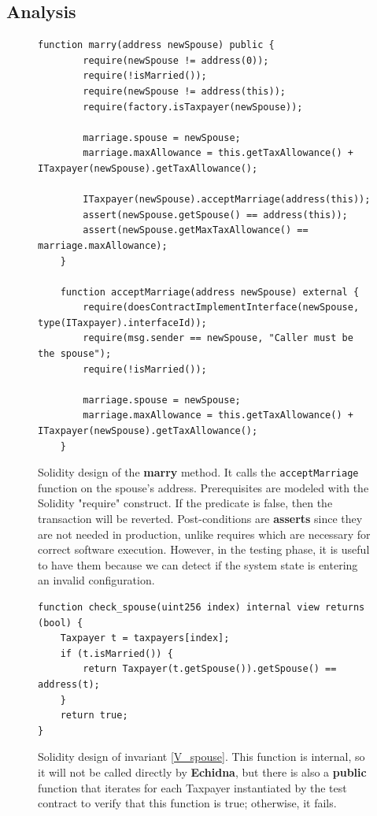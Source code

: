 \documentclass[conference]{IEEEtran}
\begin{document}
\subsection{Analysis}
\begin{figure}
	\centering
	\begin{lstlisting}[style=soliditystyle]
  function marry(address newSpouse) public {
        require(newSpouse != address(0));
        require(!isMarried());
        require(newSpouse != address(this));
        require(factory.isTaxpayer(newSpouse));

        marriage.spouse = newSpouse;
        marriage.maxAllowance = this.getTaxAllowance() + ITaxpayer(newSpouse).getTaxAllowance();

        ITaxpayer(newSpouse).acceptMarriage(address(this));
        assert(newSpouse.getSpouse() == address(this));
        assert(newSpouse.getMaxTaxAllowance() == marriage.maxAllowance);
    }

    function acceptMarriage(address newSpouse) external {
        require(doesContractImplementInterface(newSpouse, type(ITaxpayer).interfaceId));
        require(msg.sender == newSpouse, "Caller must be the spouse");
        require(!isMarried());

        marriage.spouse = newSpouse;
        marriage.maxAllowance = this.getTaxAllowance() + ITaxpayer(newSpouse).getTaxAllowance();
    }
\end{lstlisting}
	\caption{
		Solidity design of the \textbf{marry} method. It calls the \texttt{acceptMarriage} function on the spouse's address.
		Prerequisites are modeled with the Solidity "require" construct. If the predicate is false, then
		the transaction will be reverted.
		Post-conditions are \textbf{asserts} since they are not needed in production, unlike
		requires which are necessary for correct software execution.
		However, in the testing phase, it is useful to have them because we can detect if the system state
		is entering an invalid configuration.
	}
	\label{code:marry2}
\end{figure}
\begin{figure}
	\centering
	\begin{lstlisting}[style=soliditystyle]
function check_spouse(uint256 index) internal view returns (bool) {
    Taxpayer t = taxpayers[index];
    if (t.isMarried()) {
        return Taxpayer(t.getSpouse()).getSpouse() == address(t);
    }
    return true;
}
\end{lstlisting}
	\caption{Solidity design of invariant \ref{V_spouse}. This function is internal, so it will not be called directly
		by \textbf{Echidna}, but there is also a \textbf{public} function that iterates for each Taxpayer
		instantiated by the test contract to verify that this function is true; otherwise, it fails.}
	\label{code:V_marry2}
\end{figure}
\end{document}
